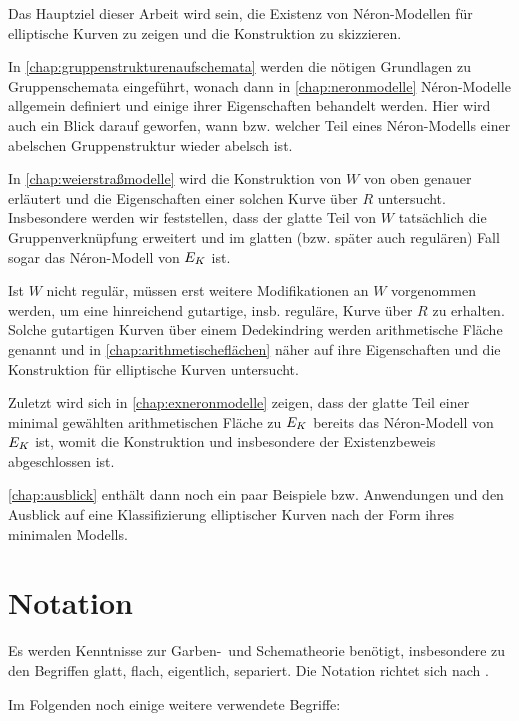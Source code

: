 \documentclass[german, bibliography=totoc]{scrreprt}
\begin{document}
Das Hauptziel dieser Arbeit wird sein, die Existenz von Néron-Modellen
für elliptische Kurven zu zeigen und die Konstruktion zu skizzieren.

In \autoref{chap:gruppenstrukturenaufschemata} werden die nötigen
Grundlagen zu Gruppenschemata eingeführt, wonach dann in
\autoref{chap:neronmodelle} Néron-Modelle allgemein definiert und
einige ihrer Eigenschaften behandelt werden.
Hier wird auch ein Blick darauf geworfen, wann bzw. welcher Teil eines
Néron-Modells einer abelschen Gruppenstruktur wieder abelsch ist.

In \autoref{chap:weierstraßmodelle} wird die Konstruktion von $W$ von
oben genauer erläutert und die Eigenschaften einer solchen Kurve über
$R$ untersucht. Insbesondere werden wir feststellen, dass der glatte
Teil von $W$ tatsächlich die Gruppenverknüpfung erweitert und im
glatten (bzw. später auch regulären) Fall sogar das Néron-Modell von
$E_{K}$ ist.

Ist $W$ nicht regulär, müssen erst weitere Modifikationen an $W$
vorgenommen werden, um eine hinreichend gutartige, insb. reguläre,
Kurve über $R$ zu erhalten. Solche gutartigen Kurven über
einem Dedekindring werden arithmetische Fläche genannt und in
\autoref{chap:arithmetischeflächen} näher auf ihre Eigenschaften und
die Konstruktion für elliptische Kurven untersucht.

Zuletzt wird sich in \autoref{chap:exneronmodelle} zeigen, dass der
glatte Teil einer minimal gewählten arithmetischen Fläche zu $E_{K}$
bereits das Néron-Modell von $E_{K}$ ist, womit die Konstruktion und
insbesondere der Existenzbeweis abgeschlossen ist.

\autoref{chap:ausblick} enthält dann noch ein paar Beispiele
bzw. Anwendungen und den Ausblick auf eine Klassifizierung
elliptischer Kurven nach der Form ihres minimalen Modells.

\section*{Notation}
Es werden Kenntnisse zur Garben-~und Schematheorie benötigt,
insbesondere zu den Begriffen glatt, flach, eigentlich, separiert.
Die Notation richtet sich nach \cite{wedhorn}.

Im Folgenden noch einige weitere verwendete Begriffe:
\end{document}

